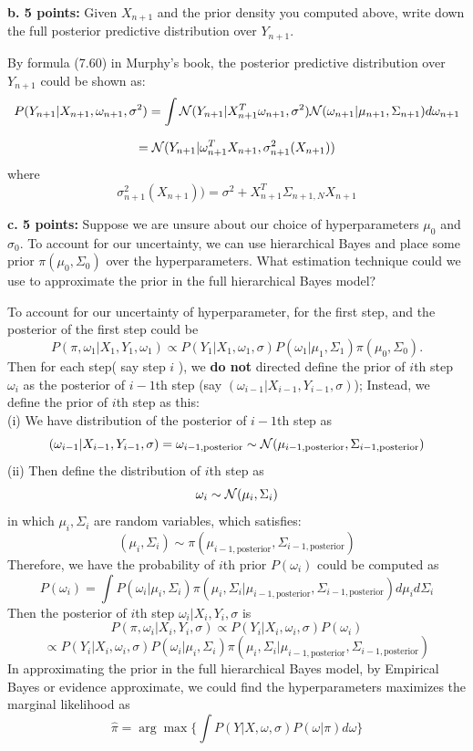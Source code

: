 \documentclass[letterpaper,10pt]{article}
\newcommand{\Nc}{{\cal N}}
\begin{document}
\begin{framed}
\textbf{b. 5 points:} Given $X_{n+1}$ and the prior density you computed above, write down the full posterior predictive distribution over $Y_{n+1}$.
\end{framed}
By formula (7.60) in Murphy's book, the posterior predictive distribution over $Y_{n+1}$ could be shown as:
$$
P(Y_{n+1}|X_{n+1}, \omega_{n+1}, \sigma^2) = \int \Nc (Y_{n+1}| X_{n+1}^T \omega_{n+1}, \sigma^2) \Nc(\omega_{n+1}| \mu_{n+1}, \Sigma_{n+1}) d\omega_{n+1}
$$

$$
= \Nc (Y_{n+1}| \omega_{n+1}^T X_{n+1}, \sigma_{n+1}^2 (X_{n+1}))
$$
where
$$
\sigma_{n+1}^2 (X_{n+1})) = \sigma^2 + X_{n+1}^T \Sigma_{n+1, N} X_{n+1}
$$

\begin{framed}
\textbf{c. 5 points:} Suppose we are unsure about our choice of hyperparameters $\mu_0$ and $\sigma_0$. To account for our uncertainty, we can use hierarchical Bayes and place some prior $\pi (\mu_0, \Sigma_0)$ over the hyperparameters. What estimation technique could we use to approximate the prior in the full hierarchical Bayes model?
\end{framed}

To account for our uncertainty of hyperparameter, for the first step, and the posterior of the first step could be
$$
P(\pi, \omega_1 | X_1, Y_1, \omega_1) \propto P(Y_1 | X_1, \omega_1, \sigma) P(\omega_1 | \mu_1,\Sigma_1) \pi(\mu_0, \Sigma_0).
$$
Then for each step( say step $i$ ), we \textbf{do not} directed define the prior of $i$th step $\omega_i$ as the posterior of $i-1$th step (say $( \omega_{i-1}| X_{i-1}, Y_{i-1}, \sigma )$); Instead, we define the prior of $i$th step as this:\\
(i) We have distribution of the posterior of $i-1$th step as
$$
( \omega_{i-1}| X_{i-1}, Y_{i-1}, \sigma ) = \omega_{i-1, \text{posterior}} \sim \Nc( \mu_{i-1, \text{posterior}}, \Sigma_{i-1, \text{posterior}})
$$
(ii) Then define the distribution of $i$th step as
$$
\omega_i \sim \Nc(\mu_i, \Sigma_i)
$$
in which $\mu_i, \Sigma_i$ are random variables, which satisfies:
$$
( \mu_i, \Sigma_i ) \sim \pi (\mu_{i-1, \text{posterior}}, \Sigma_{i-1, \text{posterior}})
$$
Therefore, we have the probability of $i$th prior $P(\omega_i)$ could be computed as
$$
P(\omega_i) = \int P(\omega_i | \mu_i, \Sigma_i) \pi (\mu_i, \Sigma_i | \mu_{i-1, \text{posterior}}, \Sigma_{i-1, \text{posterior}}) d\mu_i d\Sigma_i
$$
Then the posterior of $i$th step $\omega_i | X_i, Y_i, \sigma$ is
$$
P(\pi,\omega_i | X_i, Y_i, \sigma) \propto P(Y_i | X_i, \omega_i, \sigma) P(\omega_i)
$$
$$
\propto P(Y_i | X_i, \omega_i, \sigma) P(\omega_i | \mu_i, \Sigma_i) \pi (\mu_i, \Sigma_i | \mu_{i-1, \text{posterior}}, \Sigma_{i-1, \text{posterior}})
$$
In approximating the prior in the full hierarchical Bayes model, by Empirical Bayes or evidence approximate, we could find the hyperparameters maximizes the marginal likelihood as
$$
\hat{\pi} = \arg \max \{ \int P(Y | X, \omega, \sigma) P(\omega | \pi) d\omega  \}
$$
\end{document}

